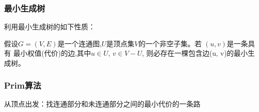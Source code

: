 \begin{frame}[fragile]
  \frametitle{最小生成树}
  利用最小生成树的如下性质：

  假设$G=(V, E)$是一个连通图,$U$是顶点集$V$的一个非空子集。若 $(u, v)$是一条具有
  最小权值(代价)的边,其中$u \in U$, $v \in V-U$, 则必存在一棵包含边(u, v)的最小生
  成树。

\end{frame}


\begin{frame}[fragile]
  \frametitle{Prim算法}
  从顶点出发：找连通部分和未连通部分之间的最小代价的一条路

\end{frame}


